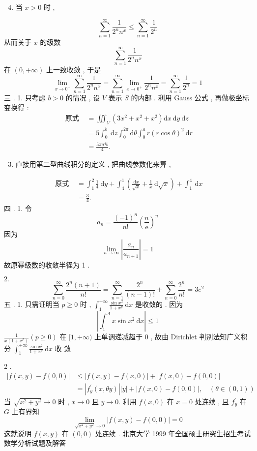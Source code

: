 \documentclass[10pt]{article}
\begin{document}
\begin{enumerate}
  \setcounter{enumi}{3}
  \item  当  $x>0$  时 ,
\end{enumerate}
$$
\sum_{n=1}^{\infty} \frac{1}{2^{n} n^{x}} \leqslant \sum_{n=1}^{\infty} \frac{1}{2^{n}}
$$
 从而关于  $x$  的级数 
$$
\sum_{n=1}^{\infty} \frac{1}{2^{n} n^{x}}
$$
 在  $(0,+\infty)$  上一致收敛 ,  于是 
$$
\lim _{x \rightarrow 0^{+}} \sum_{n=1}^{\infty} \frac{1}{2^{n} n^{x}}=\sum_{n=1}^{\infty} \lim _{x \rightarrow 0^{+}} \frac{1}{2^{n} n^{x}}=\sum_{n=1}^{\infty} \frac{1}{2^{n}}=1
$$
 三 . 1.  只考虑  $b>0$  的情况 ,  设  $V$  表示  $S$  的内部 .  利用  Gauss  公式 ,  再做极坐标变换得 :
$$
\begin{aligned}
\text { 原式 } &=\iiint_{V}\left(3 x^{2}+x^{2}+x^{2}\right) \mathrm{d} x \mathrm{~d} y \mathrm{~d} z \\
&=5 \int_{0}^{b} \mathrm{~d} z \int_{0}^{2 \pi} \mathrm{d} \theta \int_{0}^{a} r(r \cos \theta)^{2} \mathrm{~d} r \\
&=\frac{5 \pi a^{4} b}{4} .
\end{aligned}
$$

\begin{enumerate}
  \setcounter{enumi}{2}
  \item  直接用第二型曲线积分的定义 ,  把曲线参数化来算 ,
\end{enumerate}
$$
\begin{aligned}
\text { 原式 } &=\int_{1}^{2} \frac{1}{4} \mathrm{~d} y+\int_{4}^{1}\left(\frac{\mathrm{d} x}{\sqrt{x}}+\frac{1}{x} \mathrm{~d} \sqrt{x}\right)+\int_{1}^{4} \mathrm{~d} x \\
&=\frac{3}{4} .
\end{aligned}
$$
 四 . 1.  令 
$$
a_{n}=\frac{(-1)^{n}}{n !}\left(\frac{n}{\mathrm{e}}\right)^{n}
$$
 因为 
$$
\lim _{n \rightarrow \infty}\left|\frac{a_{n}}{a_{n+1}}\right|=1
$$
 故原幂级数的收敛半径为  1 .

$2 .$
$$
\sum_{n=0}^{\infty} \frac{2^{n}(n+1)}{n !}=\sum_{n=1}^{\infty} \frac{2^{n}}{(n-1) !}+\sum_{n=0}^{\infty} \frac{2^{n}}{n !}=3 e^{2}
$$
 五 . 1.  只需证明当  $p \geqslant 0$  时 , $\int_{1}^{+\infty} \frac{\sin x^{2}}{1+x^{p}} \mathrm{~d} x$  是收敛的 .  因为 
$$
\left|\int_{1}^{A} x \sin x^{2} \mathrm{~d} x\right| \leqslant 1
$$
$\frac{1}{x\left(1+x^{p}\right)}(p \geqslant 0)$  在  $[1,+\infty)$  上单调递减趋于  0 ,  故由  Dirichlet  判别法知广义积分  $\int_{1}^{+\infty} \frac{\sin x^{2}}{1+x^{p}} \mathrm{~d} x$  收   敛 

2 .
$$
\begin{aligned}
|f(x, y)-f(0,0)| & \leqslant|f(x, y)-f(x, 0)|+|f(x, 0)-f(0,0)| \\
&=\left|f_{y}^{\prime}(x, \theta y)\right||y|+|f(x, 0)-f(0,0)|, \quad(\theta \in(0,1))
\end{aligned}
$$
 当  $\sqrt{x^{2}+y^{2}} \rightarrow 0$  时 , $x \rightarrow 0$  且  $y \rightarrow 0$.  利用  $f(x, 0)$  在  $x=0$  处连续 ,  且  $f_{y}^{\prime}$  在  $G$  上有界知 
$$
\lim _{\sqrt{x^{2}+y^{2}} \rightarrow 0}|f(x, y)-f(0,0)|=0
$$
 这就说明  $f(x, y)$  在  $(0,0)$  处连续 .  北京大学  1999  年全国硕士研究生招生考试数学分析试题及解答 
\end{document}
